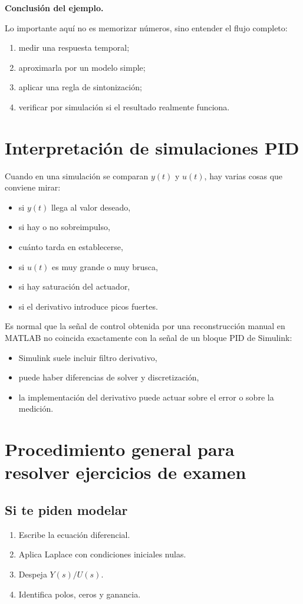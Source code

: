 \documentclass[11pt]{article}
\begin{document}
\textbf{Conclusi\'on del ejemplo.}

Lo importante aqu\'i no es memorizar n\'umeros, sino entender el flujo completo:
\begin{enumerate}[label=\arabic*.]
\item medir una respuesta temporal;
\item aproximarla por un modelo simple;
\item aplicar una regla de sintonizaci\'on;
\item verificar por simulaci\'on si el resultado realmente funciona.
\end{enumerate}

\section{Interpretaci\'on de simulaciones PID}
Cuando en una simulaci\'on se comparan $y(t)$ y $u(t)$, hay varias cosas que conviene mirar:
\begin{itemize}
\item si $y(t)$ llega al valor deseado,
\item si hay o no sobreimpulso,
\item cu\'anto tarda en establecerse,
\item si $u(t)$ es muy grande o muy brusca,
\item si hay saturaci\'on del actuador,
\item si el derivativo introduce picos fuertes.
\end{itemize}

Es normal que la se\~nal de control obtenida por una reconstrucci\'on manual en MATLAB no coincida exactamente con la se\~nal de un bloque PID de Simulink:
\begin{itemize}
\item Simulink suele incluir filtro derivativo,
\item puede haber diferencias de solver y discretizaci\'on,
\item la implementaci\'on del derivativo puede actuar sobre el error o sobre la medici\'on.
\end{itemize}

\section{Procedimiento general para resolver ejercicios de examen}
\subsection{Si te piden modelar}
\begin{enumerate}[label=\arabic*.]
\item Escribe la ecuaci\'on diferencial.
\item Aplica Laplace con condiciones iniciales nulas.
\item Despeja $Y(s)/U(s)$.
\item Identifica polos, ceros y ganancia.
\end{enumerate}
\end{document}
